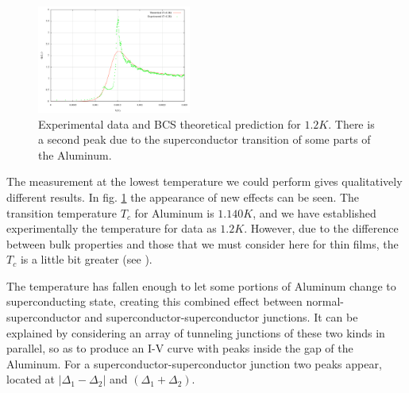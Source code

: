 \begin{figure}[h!]
\centering
\includegraphics[width=0.45\textwidth]{gv_theo_exp_10}
\caption{\small Experimental data and BCS theoretical prediction for $1.2 K$. There is a second peak due to the superconductor transition of some parts of the Aluminum.
\label{gv_theo_exp_10}}
\end{figure}

The measurement at the lowest temperature we could perform gives qualitatively different results. In fig. \ref{gv_theo_exp_10} the appearance of new effects can be seen. The transition temperature $T_c$ for Aluminum is $1.140 K$, and we have established experimentally the temperature for data as $1.2 K$. However, due to the difference between bulk properties and those that we must consider here for thin films, the $T_c$ is a little bit greater (see \cite{films}).

The temperature has fallen enough to let some portions of Aluminum change to superconducting state, creating this combined effect between normal-superconductor and superconductor-superconductor junctions. It can be explained by considering an array of tunneling junctions of these two kinds in parallel, so as to produce an I-V curve with peaks inside the gap of the Aluminum. For a superconductor-superconductor junction two peaks appear, located at $| \Delta_1-\Delta_2|$ and $(\Delta_1+\Delta_2)$.

